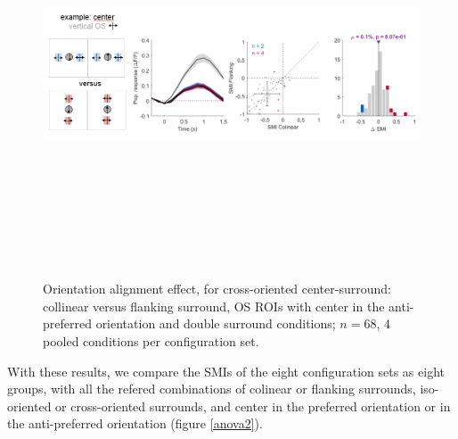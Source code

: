 \begin{figure}[H] \centering \includegraphics[width=12cm,height=12cm,keepaspectratio]{Figures/7.Results/finalPopulation/sel/diagrams/15.png} 
\caption{Orientation alignment effect, for cross-oriented center-surround: collinear versus flanking surround, OS ROIs with center in the anti-preferred orientation and double surround conditions;  $n=68$, 4 pooled conditions per configuration set.} \label{15}
\end{figure}

With these results, we compare the SMIs of the eight configuration sets as eight groups, with all the refered combinations of colinear or flanking surrounds, iso-oriented or cross-oriented surrounds, and center in the preferred orientation or in the anti-preferred orientation (figure \ref{anova2}).


